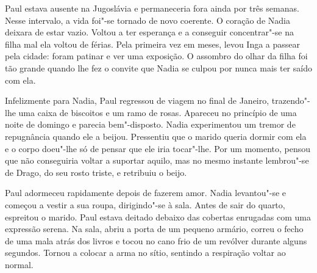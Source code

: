 Paul estava ausente na Jugoslávia e permaneceria fora ainda por três
semanas. Nesse intervalo, a vida foi"-se tornado de novo coerente. O
coração de Nadia deixara de estar vazio. Voltou a ter esperança e a
conseguir concentrar"-se na filha mal ela voltou de férias. Pela primeira vez em meses, levou
Inga a passear pela cidade: foram patinar e ver uma exposição. O
assombro do olhar da filha foi tão grande quando lhe fez o convite que
Nadia se culpou por nunca mais ter saído com ela.

Infelizmente para Nadia, Paul regressou de viagem no final de Janeiro,
trazendo"-lhe uma caixa de biscoitos e um ramo de rosas. Apareceu no
princípio de uma noite de domingo e parecia bem"-disposto. Nadia
experimentou um tremor de repugnância quando ele a beijou. Pressentiu
que o marido queria dormir com ela e o corpo doeu"-lhe só de pensar que
ele iria tocar"-lhe. Por um momento, pensou que não conseguiria voltar a
suportar aquilo, mas no mesmo instante lembrou"-se de Drago, do seu rosto
triste, e retribuiu o beijo.

Paul adormeceu rapidamente depois de fazerem amor. Nadia levantou"-se e
começou a vestir a sua roupa, dirigindo"-se à sala. Antes de sair do
quarto, espreitou o marido. Paul estava deitado debaixo das cobertas
enrugadas com uma expressão serena. Na sala, abriu a porta de um
pequeno armário, correu o fecho de uma mala atrás dos livros e tocou no
cano frio de um revólver durante alguns segundos. Tornou a colocar a
arma no sítio, sentindo a respiração voltar ao normal.

